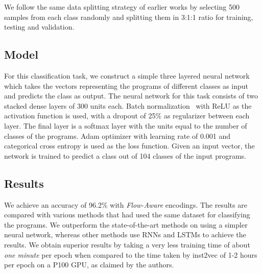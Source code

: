 We follow the same data splitting strategy of earlier works by selecting 500 samples from each class randomly and splitting them in 3:1:1 ratio for training, testing and validation.


\subsection{Model}


For this classification task, we construct a simple three layered neural network which takes the vectors representing the programs of different classes as input and predicts the class as output. The neural network for this task consists of two stacked dense layers of 300 units each. Batch normalization~\cite{pmlr-v37-ioffe15-batchnorm} with ReLU as the activation function is used, with a dropout of 25\% as regularizer between each layer. The final layer is a softmax layer with the units equal to the number of classes of the programs. Adam optimizer with learning rate of 0.001 and categorical cross entropy is used as the loss function. Given an input vector, the network is trained to predict a class out of 104 classes of the input programs. 

\subsection{Results}

We achieve an accuracy of 96.2\% with \textit{Flow-Aware} encodings. 
The results are compared with various methods that had used the same dataset for classifying the programs. We outperform the state-of-the-art methods on using a simpler neural network, whereas other methods use RNNs and LSTMs to achieve the results.
We obtain superior results by taking a very less training time of about \textit{one minute} per epoch when compared to the time taken by inst2vec of 1-2 hours per epoch on a P100 GPU, as claimed by the authors. 

